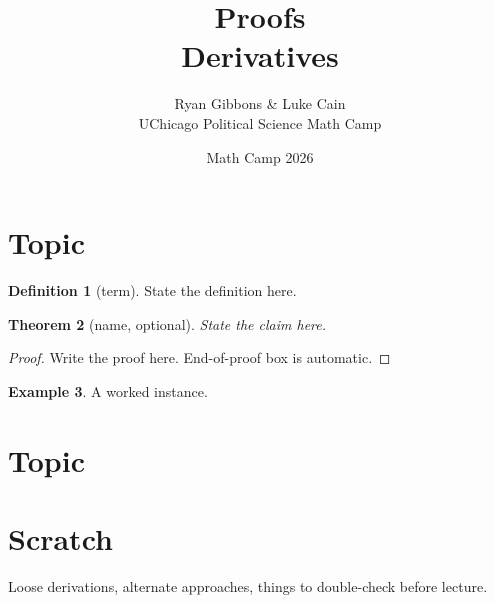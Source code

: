 \documentclass[11pt]{article}
\title{Proofs \\[0.35em] \large Derivatives}
\author{Ryan Gibbons \& Luke Cain \\ UChicago Political Science Math Camp}
\date{Math Camp 2026}
\theoremstyle{plain}
\newtheorem{theorem}{Theorem}[section]
\newtheorem{lemma}[theorem]{Lemma}
\theoremstyle{definition}
\newtheorem{definition}[theorem]{Definition}
\newtheorem{example}[theorem]{Example}
\theoremstyle{remark}
\begin{document}
\maketitle


\section{Topic}

\begin{definition}[term]
State the definition here.
\end{definition}

\begin{theorem}[name, optional]
State the claim here.
\end{theorem}

\begin{proof}
Write the proof here.  End-of-proof box is automatic.
\end{proof}

\begin{example}
A worked instance.
\end{example}


\section{Topic}



\section*{Scratch}

Loose derivations, alternate approaches, things to double-check before lecture.
\end{document}
